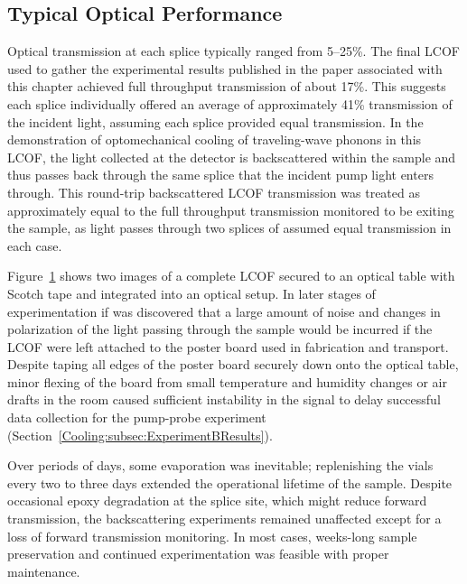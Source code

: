 \begin{figure}[t]
    \label{fig:Cooling:LCOF Taped on Table}
\end{figure}

\subsection{Typical Optical Performance}
\label{Cooling:Appendix:subsec:Typical Optical Performance}

Optical transmission at each splice typically ranged from 5–25\%. The final \ac{LCOF} used to gather the experimental results published in the paper associated with this chapter achieved full throughput transmission of about 17\%. This suggests each splice individually offered an average of approximately 41\% transmission of the incident light, assuming each splice provided equal transmission. In the demonstration of optomechanical cooling of traveling-wave phonons in this \ac{LCOF}, the light collected at the detector is backscattered within the sample and thus passes back through the same splice that the incident pump light enters through. This round-trip backscattered \ac{LCOF} transmission was treated as approximately equal to the full throughput transmission monitored to be exiting the sample, as light passes through two splices of assumed equal transmission in each case.

Figure~\ref{fig:Cooling:LCOF Taped on Table} shows two images of a complete \ac{LCOF} secured to an optical table with Scotch tape and integrated into an optical setup. In later stages of experimentation if was discovered that a large amount of noise and changes in polarization of the light passing through the sample would be incurred if the \ac{LCOF} were left attached to the poster board used in fabrication and transport. Despite taping all edges of the poster board securely down onto the optical table, minor flexing of the board from small temperature and humidity changes or air drafts in the room caused sufficient instability in the signal to delay successful data collection for the pump-probe experiment (Section~\ref{Cooling:subsec:ExperimentBResults}).

Over periods of days, some evaporation was inevitable; replenishing the vials every two to three days extended the operational lifetime of the sample. Despite occasional epoxy degradation at the splice site, which might reduce forward transmission, the backscattering experiments remained unaffected except for a loss of forward transmission monitoring. In most cases, weeks-long sample preservation and continued experimentation was feasible with proper maintenance.

